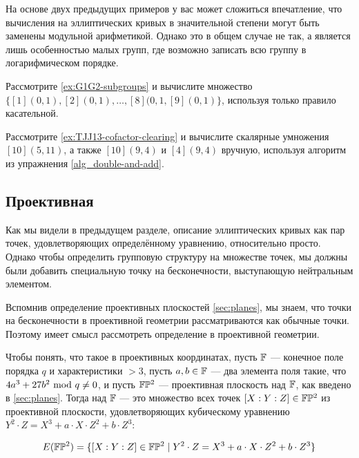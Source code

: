 На основе двух предыдущих примеров у вас может сложиться впечатление, что вычисления на эллиптических кривых в значительной степени могут быть заменены модульной арифметикой. Однако это в общем случае не так, а является лишь особенностью малых групп, где возможно записать всю группу в логарифмическом порядке.
\begin{exercise} Рассмотрите \examplename{} \ref{ex:G1G2-subgroups} и вычислите множество 
$\{[1](0,1), [2](0,1),\ldots,[8](0,1,[9](0,1)\}$, используя только правило касательной.
\end{exercise}
\begin{exercise} Рассмотрите \examplename{} \ref{ex:TJJ13-cofactor-clearing} и вычислите скалярные умножения $[10](5,11)$, а также $[10](9,4)$ и $[4](9,4)$ вручную, используя алгоритм из упражнения \ref{alg_double-and-add}.
\end{exercise}
\subsection{Проективная }
Как мы видели в предыдущем разделе, описание эллиптических кривых как пар точек, удовлетворяющих определённому уравнению, относительно просто. Однако чтобы определить групповую структуру на множестве точек, мы должны были добавить специальную точку на бесконечности, выступающую нейтральным элементом. 

Вспомнив определение проективных плоскостей \ref{sec:planes}, мы знаем, что точки на бесконечности в проективной геометрии рассматриваются как обычные точки. Поэтому имеет смысл рассмотреть определение  в проективной геометрии.

Чтобы понять, что такое  в проективных координатах, пусть $\mathbb{F}$ — конечное поле порядка $q$ и характеристики $>3$, пусть $a,b\in \mathbb{F}$ — два элемента поля такие, что $4a^3+ 27b^2 \text{ mod } q\neq 0$, и пусть $\mathbb{F}\mathbb{P}^2$ — проективная плоскость над $\mathbb{F}$, как введено в \secname{} \ref{sec:planes}. Тогда  над $\mathbb{F}$ — это множество всех точек $[X:Y:Z]\in \mathbb{F}\mathbb{P}^2$ из проективной плоскости, удовлетворяющих кубическому уравнению $Y^2\cdot Z = X^3+a\cdot X\cdot Z^2 + b\cdot Z^3$:

\begin{equation}
\label{def:projective_cubic_equation}
E(\mathbb{F}\mathbb{P}^2) = \{[X:Y:Z]\in \mathbb{F}\mathbb{P}^2\;|\; Y^2\cdot Z = X^3+a\cdot X\cdot Z^2 + b\cdot Z^3 \}
\end{equation}

